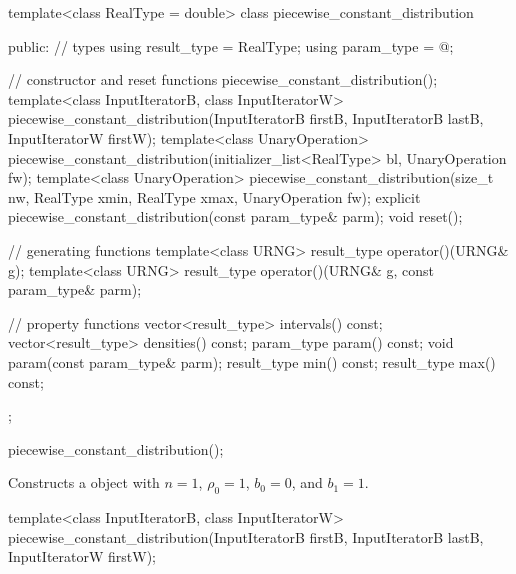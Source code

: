\begin{codeblock}
template<class RealType = double>
 class piecewise_constant_distribution
{
public:
 // types
 using result_type = RealType;
 using param_type  = @\unspec@;

 // constructor and reset functions
 piecewise_constant_distribution();
 template<class InputIteratorB, class InputIteratorW>
   piecewise_constant_distribution(InputIteratorB firstB, InputIteratorB lastB,
                                   InputIteratorW firstW);
 template<class UnaryOperation>
   piecewise_constant_distribution(initializer_list<RealType> bl, UnaryOperation fw);
 template<class UnaryOperation>
   piecewise_constant_distribution(size_t nw, RealType xmin, RealType xmax, UnaryOperation fw);
 explicit piecewise_constant_distribution(const param_type& parm);
 void reset();

 // generating functions
 template<class URNG>
   result_type operator()(URNG& g);
 template<class URNG>
   result_type operator()(URNG& g, const param_type& parm);

 // property functions
 vector<result_type> intervals() const;
 vector<result_type> densities() const;
 param_type param() const;
 void param(const param_type& parm);
 result_type min() const;
 result_type max() const;
};
\end{codeblock}


%
\begin{itemdecl}
piecewise_constant_distribution();
\end{itemdecl}

\begin{itemdescr}
\pnum\effects Constructs a  object
 with $ n = 1 $,
 $\rho_0 = 1 $,
 $ b_0 = 0 $,
 and $ b_1 = 1 $.
\end{itemdescr}


%
\begin{itemdecl}
template<class InputIteratorB, class InputIteratorW>
 piecewise_constant_distribution(InputIteratorB firstB, InputIteratorB lastB,
                                 InputIteratorW firstW);
\end{itemdecl}

